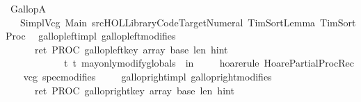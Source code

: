 %
\begin{isabellebody}%
%
%
\isadelimtheory
%
\endisadelimtheory
%
\isatagtheory
{}\isamarkupfalse%
\ GallopA\isanewline
\ \ \ {\isachardoublequoteopen}{\isachardot}{\isachardot}{\isacharslash}Simpl{\isacharslash}Vcg{\isachardoublequoteclose}\ Main\ {\isachardoublequoteopen}{\isachartilde}{\isachartilde}{\isacharslash}src{\isacharslash}HOL{\isacharslash}Library{\isacharslash}Code{\isacharunderscore}Target{\isacharunderscore}Numeral{\isachardoublequoteclose}\ {\isachardoublequoteopen}TimSortLemma{\isachardoublequoteclose}\ {\isachardoublequoteopen}TimSortProc{\isachardoublequoteclose}\isanewline
{}%
\endisatagtheory
{\isafoldtheory}%
%
\isadelimtheory
\isanewline
%
\endisadelimtheory
\isanewline
\isanewline
\isanewline
{}\isamarkupfalse%
\ {\isacharparenleft}\ gallop{\isacharunderscore}left{\isacharunderscore}impl{\isacharparenright}\ gallop{\isacharunderscore}left{\isacharunderscore}modifies{\isacharcolon}\isanewline
\ \ \isanewline
\ \ {\isachardoublequoteopen}{\isasymforall}\ {\isasymsigma}{\isachardot}\ {\isasymGamma}{\isasymturnstile}\ {\isacharbraceleft}{\isasymsigma}{\isacharbraceright}\ {\isasymacute}ret{\isacharcolon}{\isacharequal}{\isacharequal}\ PROC\ gallop{\isacharunderscore}left{\isacharparenleft}{\isasymacute}key{\isacharcomma}\ {\isasymacute}array{\isacharcomma}\ {\isasymacute}base{\isacharcomma}\ {\isasymacute}len{\isacharcomma}\ {\isasymacute}hint{\isacharparenright}\isanewline
\ \ \ \ \ \ \ \ \ \ \ \ {\isacharbraceleft}t{\isachardot}\ t\ may{\isacharunderscore}only{\isacharunderscore}modify{\isacharunderscore}globals\ {\isasymsigma}\ in\ {\isacharbrackleft}{\isacharbrackright}{\isacharbraceright}{\isachardoublequoteclose}\isanewline
%
\isadelimproof
\ \ %
\endisadelimproof
%
\isatagproof
{}\isamarkupfalse%
\ {\isacharparenleft}hoare{\isacharunderscore}rule\ HoarePartial{\isachardot}ProcRec{}{\isacharparenright}\isanewline
\ \ \isamarkupfalse%
\ {\isacharparenleft}vcg\ spec{\isacharequal}modifies{\isacharparenright}\isanewline
\ \ \isamarkupfalse%
%
\endisatagproof
{\isafoldproof}%
%
\isadelimproof
\isanewline
%
\endisadelimproof
\isanewline
{}\isamarkupfalse%
\ {\isacharparenleft}\ gallop{\isacharunderscore}right{\isacharunderscore}impl{\isacharparenright}\ gallop{\isacharunderscore}right{\isacharunderscore}modifies{\isacharcolon}\isanewline
\ \ \isanewline
\ \ {\isachardoublequoteopen}{\isasymforall}\ {\isasymsigma}{\isachardot}\ {\isasymGamma}{\isasymturnstile}\ {\isacharbraceleft}{\isasymsigma}{\isacharbraceright}\ {\isasymacute}ret{\isacharcolon}{\isacharequal}{\isacharequal}\ PROC\ gallop{\isacharunderscore}right{\isacharparenleft}{\isasymacute}key{\isacharcomma}\ {\isasymacute}array{\isacharcomma}\ {\isasymacute}base{\isacharcomma}\ {\isasymacute}len{\isacharcomma}\ {\isasymacute}hint{\isacharparenright}\isanewline

\end{isabellebody}
